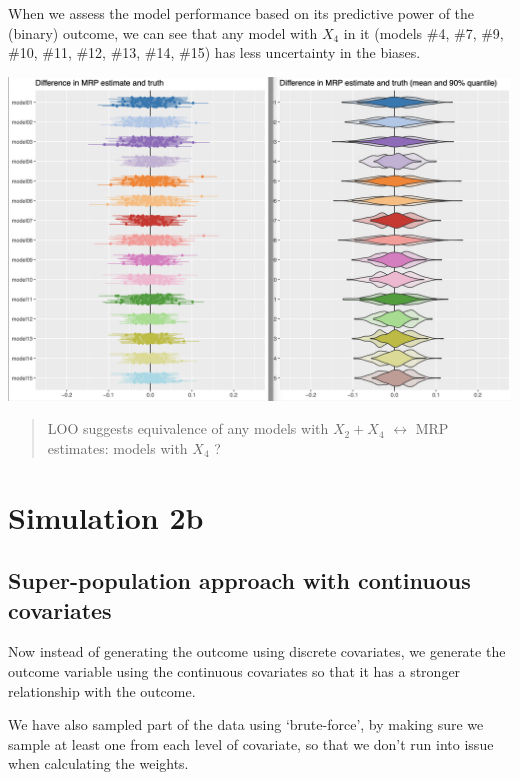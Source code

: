 \documentclass[
]{article}
\begin{document}
When we assess the model performance based on its predictive power of
the (binary) outcome, we can see that any model with \(X_4\) in it
(models \#4, \#7, \#9, \#10, \#11, \#12, \#13, \#14, \#15) has less
uncertainty in the biases.

\includegraphics{images/image.png}

\begin{quote}
LOO suggests equivalence of any models with \(X_2 + X_4\)
\(\leftrightarrow\) \newline MRP estimates: models with \(X_4\) ?
\end{quote}

\hypertarget{simulation-2b}{%
\section{Simulation 2b}\label{simulation-2b}}

\hypertarget{super-population-approach-with-continuous-covariates}{%
\subsection{Super-population approach with continuous
covariates}\label{super-population-approach-with-continuous-covariates}}

Now instead of generating the outcome using discrete covariates, we
generate the outcome variable using the continuous covariates so that it
has a stronger relationship with the outcome.

We have also sampled part of the data using `brute-force', by making
sure we sample at least one from each level of covariate, so that we
don't run into issue when calculating the weights.
\end{document}
